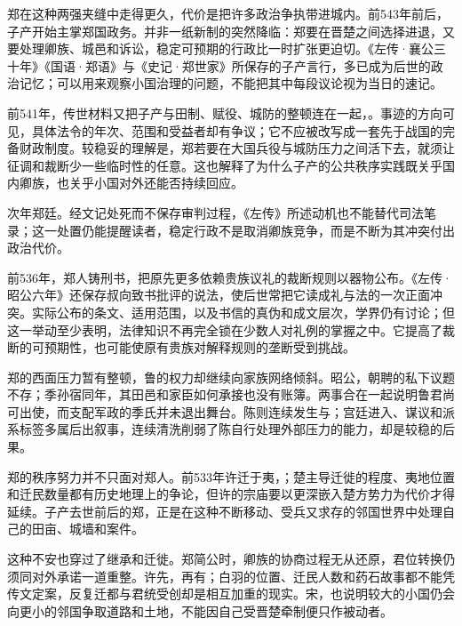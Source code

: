 郑在这种两强夹缝中走得更久，代价是把许多政治争执带进城内。前543年前后，子产开始主掌郑国政务。并非一纸新制的突然降临：郑要在晋楚之间选择进退，又要处理卿族、城邑和诉讼，稳定可预期的行政比一时扩张更迫切。《左传·襄公三十年》《国语·郑语》与《史记·郑世家》所保存的子产言行，多已成为后世的政治记忆；可以用来观察小国治理的问题，不能把其中每段议论视为当日的速记。

前541年，传世材料又把子产与田制、赋役、城防的整顿连在一起，。事迹的方向可见，具体法令的年次、范围和受益者却有争议；它不应被改写成一套先于战国的完备财政制度。较稳妥的理解是，郑若要在大国兵役与城防压力之间活下去，就须让征调和裁断少一些临时性的任意。这也解释了为什么子产的公共秩序实践既关乎国内卿族，也关乎小国对外还能否持续回应。

次年郑廷。经文记处死而不保存审判过程，《左传》所述动机也不能替代司法笔录；这一处置仍能提醒读者，稳定行政不是取消卿族竞争，而是不断为其冲突付出政治代价。

前536年，郑人铸刑书，把原先更多依赖贵族议礼的裁断规则以器物公布。《左传·昭公六年》还保存叔向致书批评的说法，使后世常把它读成礼与法的一次正面冲突。实际公布的条文、适用范围，以及书信的真伪和成文层次，学界仍有讨论；但这一举动至少表明，法律知识不再完全锁在少数人对礼例的掌握之中。它提高了裁断的可预期性，也可能使原有贵族对解释规则的垄断受到挑战。

郑的西面压力暂有整顿，鲁的权力却继续向家族网络倾斜。昭公，朝聘的私下议题不存；季孙宿同年，其田邑和家臣如何承接也没有账簿。两事合在一起说明鲁君尚可出使，而支配军政的季氏并未退出舞台。陈则连续发生与；宫廷进入、谋议和派系标签多属后出叙事，连续清洗削弱了陈自行处理外部压力的能力，却是较稳的后果。

郑的秩序努力并不只面对郑人。前533年许迁于夷，；楚主导迁徙的程度、夷地位置和迁民数量都有历史地理上的争论，但许的宗庙要以更深嵌入楚方势力为代价才得延续。子产去世前后的郑，正是在这种不断移动、受兵又求存的邻国世界中处理自己的田亩、城墙和案件。

这种不安也穿过了继承和迁徙。郑简公时，卿族的协商过程无从还原，君位转换仍须同对外承诺一道重整。许先，再有；白羽的位置、迁民人数和药石故事都不能凭传文定案，反复迁都与君统受创却是相互加重的现实。宋，也说明较大的小国仍会向更小的邻国争取道路和土地，不能因自己受晋楚牵制便只作被动者。

